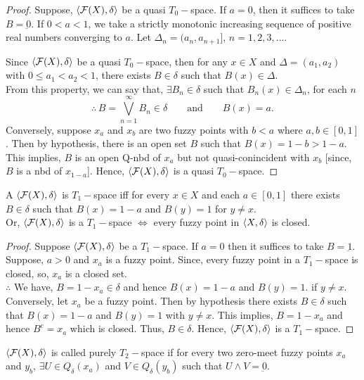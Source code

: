 \documentclass[../main-sheet.tex]{subfiles}
\begin{document}
\begin{proof}
    Suppose, \(\langle \mathcal{F}(X), \delta \rangle\) be a quasi \(T_0-\)space. If \(a=0\), then it suffices to take \(B=\underbar{0}\). If \(0<a<1\), we take a strictly monotonic increasing sequence of positive real numbers converging to \(a\). Let \(\Delta_n=(a_n,a_{n+1}]\), \(n=1,2,3,\dots\).

    Since \(\langle \mathcal{F}(X), \delta \rangle\) be a quasi \(T_0-\)space, then for any \(x\in X\) and \(\Delta=(a_1,a_2)\) with \(0\leq a_1<a_2<1\), there exists \(B\in\delta\) such that \(B(x)\in \Delta\).\\
    From this property, we can say that, \(\exists B_n\in\delta\) such that \(B_n(x)\in \Delta_n\), for each \(n\)
    \[\therefore\,B=\bigvee_{n=1}^\infty B_n\in \delta\qquad\text{and}\qquad B(x)=a.\]
    Conversely, suppose \(x_a\) and \(x_b\) are two fuzzy points with \(b<a\) where \(a,b\in[0,1]\). Then by hypothesis, there is an open set \(B\) such that \(B(x)=1-b>1-a\).\\
    This implies, \(B\) is an open Q-nbd of \(x_a\) but not quasi-conincident with \(x_b\) [since, \(B\) is a nbd of \(x_{1-a}\)]. Hence, \(\langle \mathcal{F}(X), \delta \rangle\) is a quasi \(T_0-\)space.
\end{proof}
\begin{thm}
    A \fts \(\langle \mathcal{F}(X), \delta \rangle\) is \(T_1-\)space iff for every \(x\in X\) and each \(a\in[0,1]\) there exists \(B\in\delta\) such that \(B(x)=1-a\) and \(B(y)=1\) for \(y\neq x\).\\
    Or, \(\langle \mathcal{F}(X), \delta \rangle\) is a \(T_1-\)space \(\Leftrightarrow\) every fuzzy point in \(\langle X, \delta \rangle\) is closed.
\end{thm}
\begin{proof}
    Suppose \(\langle \mathcal{F}(X), \delta \rangle\) be a \(T_1-\)space. If \(a=0\) then it suffices to take \(B=\underbar{1}\).\\
    Suppose, \(a>0\) and \(x_a\) is a fuzzy point. Since, every fuzzy point in a \(T_1-\)space is closed, so, \(x_a\) is a closed set.\\
    \(\therefore\) We have, \(B=1-x_a\in\delta\) and hence \(B(x)=1-a\) and \(B(y)=1\). if \(y\neq x\).\\
    Conversely, let \(x_a\) be a fuzzy point. Then by hypothesis there exists \(B\in\delta\) such that \(B(x)=1-a\) and \(B(y)=1\) with \(y\neq x\). This implies, \(B=1-x_a\) and hence \(B^c=x_a\) which is closed. Thus, \(B\in\delta\). Hence, \(\langle \mathcal{F}(X), \delta \rangle\) is a \(T_1-\)space.
\end{proof}
\begin{defn}
    \(\langle \mathcal{F}(X), \delta \rangle\) is called purely \(T_2-\)space if for every two zero-meet fuzzy points \(x_a\) and \(y_b\), \(\exists U\in Q_\delta(x_a)\) and \(V\in Q_\delta(y_b)\) such that \(U\wedge V=\underbar{0}\).
\end{defn}
\end{document}
